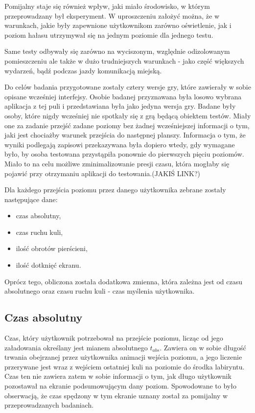 \documentclass[a4paper,12pt,numbers=noenddot]{report}
\begin{document}
Pomijalny staje się również wpływ, jaki miało środowisko, w którym przeprowadzany był eksperyment. W uproszczeniu założyć można, że w warunkach, jakie były zapewnione użytkownikom zarówno oświetlenie, jak i poziom hałasu utrzymywał się na jednym poziomie dla jednego testu.

Same testy odbywały się zarówno na wyciszonym, względnie odizolowanym pomieszczeniu ale także w dużo trudniejszych warunkach - jako część większych wydarzeń, bądź podczas jazdy komunikacją miejską. 

Do celów badania przygotowane zostały cztery wersje gry, które zawierały w sobie opisane wcześniej interfejsy. Osobie badanej przyznawana była losowo wybrana aplikacja z tej puli i przedstawiana była jako jedyna wersja gry. 
Badane były osoby, które nigdy wcześniej nie spotkały się z grą będącą obiektem testów. Miały one za zadanie przejść zadane poziomy bez żadnej wcześniejszej informacji o tym, jaki jest chociażby warunek przejścia do następnej planszy. Informacja o tym, że wyniki podlegają zapisowi przekazywana była dopiero wtedy, gdy wymagane było, by osoba testowana przystąpiła ponownie do pierwszych pięciu poziomów. Miało to na celu możliwe zminimalizowanie presji czasu, która mogłaby się pojawić przy otrzymaniu aplikacji do testowania.(JAKIŚ LINK?)

Dla każdego przejścia poziomu przez danego użytkownika zebrane zostały następujące dane:
\begin{itemize}
\item czas absolutny, 
\item czas ruchu kuli,
\item ilość obrotów pierścieni,
\item ilość dotknięć ekranu.
\end{itemize}
Oprócz tego, obliczona została dodatkowa zmienna, która zależna jest od czasu absolutnego oraz czasu ruchu kuli - czas myślenia użytkownika.

	\subsection{Czas absolutny}
Czas, który użytkownik potrzebował na przejście poziomu, licząc od jego załadowania określany jest mianem absolutnego $t_{abs}$. Zawiera on w sobie długość trwania obejrzanej przez użytkownika animacji wejścia poziomu, a jego liczenie przerywane jest wraz z wejściem ostatniej kuli na poziomie do środka labiryntu. Czas ten nie zawiera zatem w sobie informacji o tym, jak długo użytkownik pozostawał na ekranie podsumowującym dany poziom. Spowodowane to było obserwacją, że czas spędzony w tym ekranie uznany został za pomijalny w przeprowadzanych badaniach.
\end{document}
